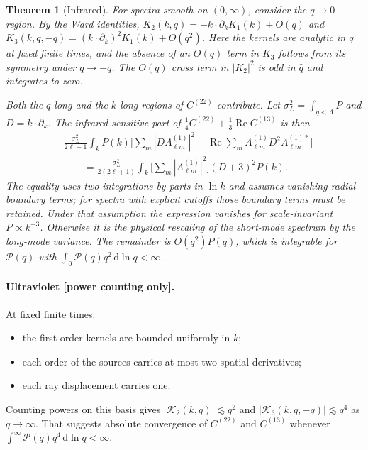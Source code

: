 \documentclass[11pt]{article}
\newtheorem{theorem}{Theorem}
\theoremstyle{definition}
\theoremstyle{remark}
\newcommand{\dd}{\mathrm{d}}
\newcommand{\st}[1]{\textsf{[#1]}}
\begin{document}
\begin{theorem}[Infrared]\label{thm:ir}
For spectra smooth on $(0,\infty)$, consider the $q\to0$ region. By the Ward identities,
$K_2(k,q)=-k\cdot\partial_kK_1(k)+O(q)$ and $K_3(k,q,-q)=(k\cdot\partial_k)^2K_1(k)+O(q^2)$.
Here the kernels are analytic in $q$ at fixed finite times, and the absence of an $O(q)$ term in
$K_3$ follows from its symmetry under $q\to-q$. The $O(q)$ cross term in $|K_2|^2$ is odd in
$\hat q$ and integrates to zero.

Both the $q$-long and the $k$-long regions of $C^{(22)}$ contribute. Let
$\sigma_L^2=\int_{q<\Lambda}P$ and $D=k\cdot\partial_k$. The infrared-sensitive part of
$\frac14C^{(22)}+\frac13\operatorname{Re}C^{(13)}$ is then
\begin{align*}
&\frac{\sigma_L^2}{2\ell+1}\int_kP(k)\Big[\sum_m|DA^{(1)}_{\ell m}|^2
+\operatorname{Re}\sum_mA^{(1)}_{\ell m}D^2A^{(1)*}_{\ell m}\Big]\\
&\qquad=\frac{\sigma_L^2}{2(2\ell+1)}\int_k
\Big[\sum_m|A^{(1)}_{\ell m}|^2\Big](D+3)^2P(k).
\end{align*}
The equality uses two integrations by parts in $\ln k$ and assumes vanishing radial boundary
terms; for spectra with explicit cutoffs those boundary terms must be retained. Under that
assumption the expression vanishes for scale-invariant $P\propto k^{-3}$. Otherwise it is the
physical rescaling of the short-mode spectrum by the long-mode variance. The remainder is
$O(q^2)P(q)$, which is integrable for $\mathcal P(q)$ with $\int_0\mathcal P(q)q^2\,\dd\ln q<\infty$.
\end{theorem}

\paragraph{Ultraviolet \st{power counting only}.} At fixed finite times:
\begin{itemize}
\item the first-order kernels are bounded uniformly in $k$;
\item each order of the sources carries at most two spatial derivatives;
\item each ray displacement carries one.
\end{itemize}
Counting powers on this basis gives $|\mathcal K_2(k,q)|\lesssim q^2$ and
$|\mathcal K_3(k,q,-q)|\lesssim q^4$ as $q\to\infty$. That suggests absolute convergence of
$C^{(22)}$ and $C^{(13)}$ whenever $\int^\infty\mathcal P(q)q^4\,\dd\ln q<\infty$.
\end{document}
